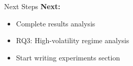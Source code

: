 \documentclass[aspectratio=169]{beamer}
\begin{document}






\begin{frame}{Next Steps}
\textbf{Next:}
\begin{itemize}
\item Complete results analysis
\item RQ3: High-volatility regime analysis
\item Start writing experiments section
\end{itemize}
\end{frame}


\end{document}
